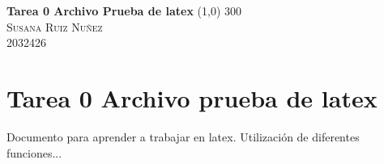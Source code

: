 \documentclass{article}
\begin{document}
\begin{titlepage}
	\begin{center}
	\huge{\textbf{Tarea 0 Archivo Prueba de latex}}
	\line(1,0) {300}\\
	
	\textsc{ \Large Susana Ruiz Nuñez \\ 2032426} 
	\end{center}
	
\end{titlepage}

\newpage
	\section{Tarea 0 Archivo prueba de latex}
	 Documento para aprender a trabajar en latex. Utilización de diferentes funciones... \cite{HM}



\end{document}
